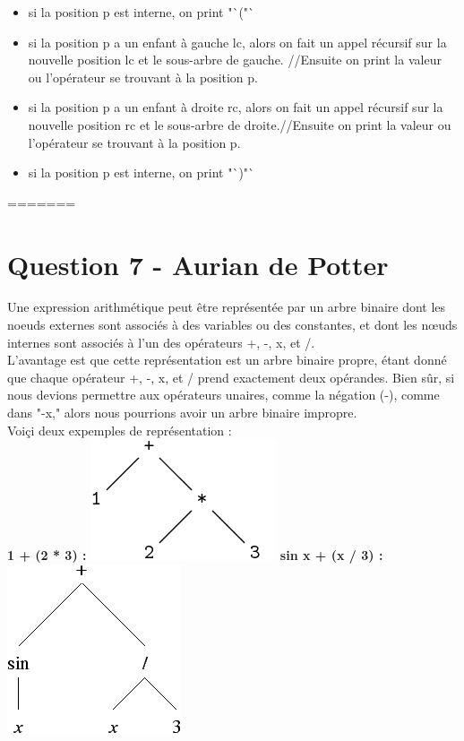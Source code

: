 \documentclass[10pt,a4paper]{article}
\begin{document}
\begin{itemize}
	\item si la position p est interne, on print "`("`
	\item si la position p a un enfant à gauche lc, alors on fait un appel récursif sur la nouvelle position lc et le sous-arbre de gauche. //Ensuite on print la valeur ou l'opérateur se trouvant à la position p.
	\item si la position p a un enfant à droite rc, alors on fait un appel récursif sur la nouvelle position rc et le sous-arbre de droite.//Ensuite on print la valeur ou l'opérateur se trouvant à la position p.
	\item si la position p est interne, on print "`)"`
\end{itemize}


=======
\section*{Question 7 - Aurian de Potter}

Une expression arithmétique peut être représentée par un arbre binaire dont les noeuds externes sont associés à des variables ou des constantes, et dont les nœuds internes sont associés à l'un des opérateurs +, -, x, et /.\\

L'avantage est que cette représentation est un arbre binaire propre, étant donné que chaque opérateur +, -, x, et / prend exactement deux opérandes. Bien sûr, si nous devions permettre aux opérateurs unaires, comme la négation (-), comme dans "-x," alors nous pourrions avoir un arbre binaire impropre.\\

Voiçi deux expemples de représentation :\\

\textbf{1 + (2 * 3) :} \includegraphics[scale=1]{arithmetique.png}
\textbf{sin x + (x / 3) :} \includegraphics[scale=0.5]{analytique.png}\\
\end{document}
